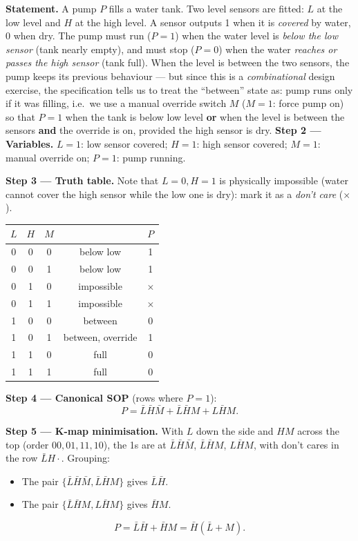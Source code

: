 \documentclass[11pt]{article}
\begin{document}
\begin{exoresolu}
\textbf{Statement.} A pump $P$ fills a water tank. Two level sensors are fitted: $L$ at the low level and $H$ at the high level. A sensor outputs 1 when it is \emph{covered} by water, 0 when dry. The pump must run ($P=1$) when the water level is \emph{below the low sensor} (tank nearly empty), and must stop ($P=0$) when the water \emph{reaches or passes the high sensor} (tank full). When the level is between the two sensors, the pump keeps its previous behaviour — but since this is a \emph{combinational} design exercise, the specification tells us to treat the ``between'' state as: pump runs only if it was filling, i.e.\ we use a manual override switch $M$ ($M=1$: force pump on) so that $P=1$ when the tank is below low level \textbf{or} when the level is between the sensors \textbf{and} the override is on, provided the high sensor is dry.
\tcblower
\textbf{Step 2 — Variables.} $L=1$: low sensor covered; $H=1$: high sensor covered; $M=1$: manual override on; $P=1$: pump running.

\textbf{Step 3 — Truth table.} Note that $L=0, H=1$ is physically impossible (water cannot cover the high sensor while the low one is dry): mark it as a \emph{don't care} ($\times$).

\begin{center}
\begin{tabular}{|c|c|c|c||c|}
\hline
\rowcolor{popblueL} $L$ & $H$ & $M$ & & $P$ \\
\hline
0 & 0 & 0 & below low & 1 \\
0 & 0 & 1 & below low & 1 \\
0 & 1 & 0 & impossible & $\times$ \\
0 & 1 & 1 & impossible & $\times$ \\
1 & 0 & 0 & between & 0 \\
1 & 0 & 1 & between, override & 1 \\
1 & 1 & 0 & full & 0 \\
1 & 1 & 1 & full & 0 \\
\hline
\end{tabular}
\end{center}

\textbf{Step 4 — Canonical SOP} (rows where $P=1$):
\[
P = \bar{L}\bar{H}\bar{M} + \bar{L}\bar{H}M + L\bar{H}M.
\]

\textbf{Step 5 — K-map minimisation.} With $L$ down the side and $HM$ across the top (order $00, 01, 11, 10$), the 1s are at $\bar{L}\bar{H}\bar{M}$, $\bar{L}\bar{H}M$, $L\bar{H}M$, with don't cares in the row $\bar{L}H\cdot$. Grouping:
\begin{itemize}
\item The pair $\{\bar{L}\bar{H}\bar{M}, \bar{L}\bar{H}M\}$ gives $\bar{L}\bar{H}$.
\item The pair $\{\bar{L}\bar{H}M, L\bar{H}M\}$ gives $\bar{H}M$.
\end{itemize}
\[
P = \bar{L}\bar{H} + \bar{H}M = \bar{H}(\bar{L} + M).
\]


\end{exoresolu}
\end{document}
